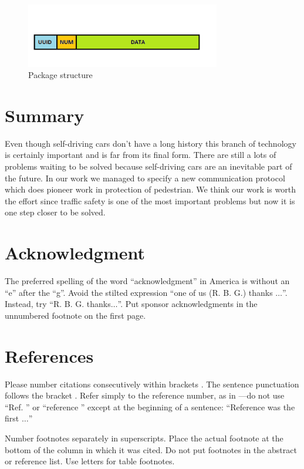 \documentclass[conference]{IEEEtran}
\begin{document}
\begin{figure}[h]
    \centering
    \includegraphics[width=8.5cm]{./pics/Package structure.png}
    \caption{Package structure}
\end{figure}

\section{Summary}
Even though self-driving cars don't have a long history this branch of technology is certainly important and is far from its final form. There are still a lots of problems waiting to be solved because self-driving cars are an inevitable part of the future. In our work we managed to specify a new communication protocol which does pioneer work in protection of pedestrian. We think our work is worth the effort since traffic safety is one of the most important problems but now it is one step closer to be solved.

\section*{Acknowledgment}

The preferred spelling of the word ``acknowledgment'' in America is without
an ``e'' after the ``g''. Avoid the stilted expression ``one of us (R. B.
G.) thanks $\ldots$''. Instead, try ``R. B. G. thanks$\ldots$''. Put sponsor
acknowledgments in the unnumbered footnote on the first page.

\section*{References}

Please number citations consecutively within brackets \cite{b1}. The
sentence punctuation follows the bracket \cite{b2}. Refer simply to the reference
number, as in \cite{b3}---do not use ``Ref. \cite{b3}'' or ``reference \cite{b3}'' except at
the beginning of a sentence: ``Reference \cite{b3} was the first $\ldots$''

Number footnotes separately in superscripts. Place the actual footnote at
the bottom of the column in which it was cited. Do not put footnotes in the
abstract or reference list. Use letters for table footnotes.
\end{document}
